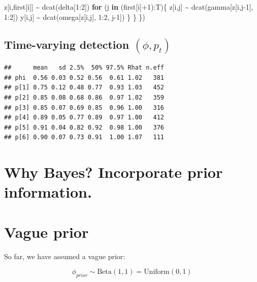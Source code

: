\documentclass[
  12pt,
]{krantz}
\newenvironment{Shaded}{\begin{snugshade}}{\end{snugshade}}
\newcommand{\ControlFlowTok}[1]{\textcolor[rgb]{0.13,0.29,0.53}{\textbf{#1}}}
\newcommand{\DecValTok}[1]{\textcolor[rgb]{0.00,0.00,0.81}{#1}}
\newcommand{\FunctionTok}[1]{\textcolor[rgb]{0.00,0.00,0.00}{#1}}
\newcommand{\NormalTok}[1]{#1}
\newcommand{\SpecialCharTok}[1]{\textcolor[rgb]{0.00,0.00,0.00}{#1}}
\begin{document}
\begin{Shaded}
\begin{Highlighting}[]
\NormalTok{    z[i,first[i]] }\SpecialCharTok{\textasciitilde{}} \FunctionTok{dcat}\NormalTok{(delta[}\DecValTok{1}\SpecialCharTok{:}\DecValTok{2}\NormalTok{])}
    \ControlFlowTok{for}\NormalTok{ (j }\ControlFlowTok{in}\NormalTok{ (first[i]}\SpecialCharTok{+}\DecValTok{1}\NormalTok{)}\SpecialCharTok{:}\NormalTok{T)\{}
\NormalTok{      z[i,j] }\SpecialCharTok{\textasciitilde{}} \FunctionTok{dcat}\NormalTok{(gamma[z[i,j}\DecValTok{{-}1}\NormalTok{], }\DecValTok{1}\SpecialCharTok{:}\DecValTok{2}\NormalTok{])}
\NormalTok{      y[i,j] }\SpecialCharTok{\textasciitilde{}} \FunctionTok{dcat}\NormalTok{(omega[z[i,j], }\DecValTok{1}\SpecialCharTok{:}\DecValTok{2}\NormalTok{, j}\DecValTok{{-}1}\NormalTok{])}
\NormalTok{    \}}
\NormalTok{  \}}
\NormalTok{\})}
\end{Highlighting}
\end{Shaded}

\hypertarget{time-varying-detection-phi-p_t-1}{%
\subsection{\texorpdfstring{Time-varying detection \((\phi, p_t)\)}{Time-varying detection (\textbackslash phi, p\_t)}}\label{time-varying-detection-phi-p_t-1}}

\begin{verbatim}
##      mean   sd 2.5%  50% 97.5% Rhat n.eff
## phi  0.56 0.03 0.52 0.56  0.61 1.02   381
## p[1] 0.75 0.12 0.48 0.77  0.93 1.03   452
## p[2] 0.85 0.08 0.68 0.86  0.97 1.02   359
## p[3] 0.85 0.07 0.69 0.85  0.96 1.00   316
## p[4] 0.89 0.05 0.77 0.89  0.97 1.00   412
## p[5] 0.91 0.04 0.82 0.92  0.98 1.00   376
## p[6] 0.90 0.07 0.73 0.91  1.00 1.07   111
\end{verbatim}

\hypertarget{why-bayes-incorporate-prior-information.}{%
\section{Why Bayes? Incorporate prior information.}\label{why-bayes-incorporate-prior-information.}}

\hypertarget{vague-prior}{%
\section{Vague prior}\label{vague-prior}}

So far, we have assumed a vague prior:

\[\phi_{prior} \sim \text{Beta}(1,1) = \text{Uniform}(0,1)\]
\end{document}

